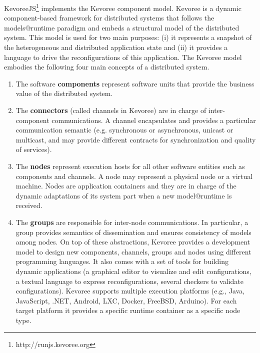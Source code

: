 KevoreeJS\footnote{http://runjs.kevoree.org}  implements the Kevoree component model. Kevoree is a dynamic component-based framework for distributed systems that follows the models@runtime paradigm and embeds a structural model of the distributed system. This model is used for two main purposes: (i) it represents a snapshot of the heterogeneous and distributed application state and (ii) it provides a language to drive the reconfigurations of this application. The Kevoree model embodies the following four main concepts of a distributed system.

\begin{enumerate}
	\item The software \textbf{components} represent software units that provide the business value of the distributed system.
\item The \textbf{connectors} (called channels in Kevoree) are in charge of inter-component communications. A channel encapsulates and provides a particular communication semantic (e.g. synchronous or asynchronous, unicast or multicast, and may provide different contracts for synchronization and quality of services).
\item The \textbf{nodes} represent execution hosts for all other software entities such as components and channels. A node may represent a physical node or a virtual machine. Nodes are application containers and they are in charge of the dynamic adaptations of its system part when a new model@runtime is received.
\item The \textbf{groups} are responsible for inter-node communications. In particular, a group provides semantics of dissemination and ensures consistency of models among nodes. On top of these abstractions, Kevoree provides a development model to design new components, channels, groups and nodes using different programming languages. It also comes with a set of tools for building dynamic applications (a graphical editor to visualize and edit configurations, a textual language to express reconfigurations, several checkers to validate configurations). Kevoree supports multiple execution platforms (e.g., Java, JavaScript, .NET, Android, LXC, Docker, FreeBSD, Arduino). For each target platform it provides a specific runtime container as a specific node type.

\end{enumerate}


